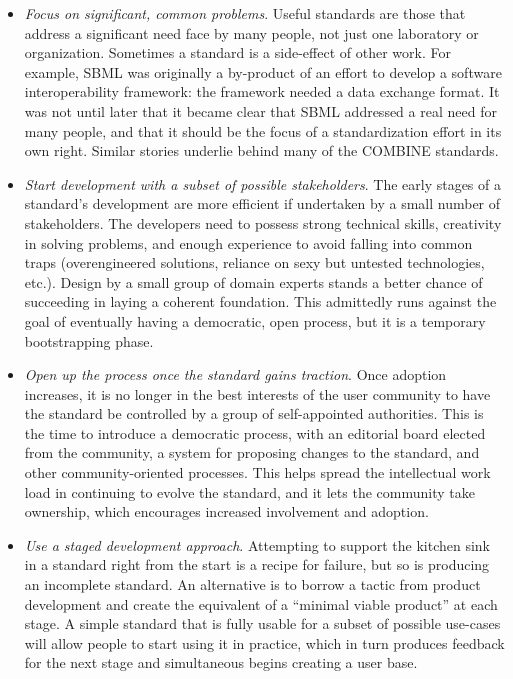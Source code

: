 \vspace*{-1em}
\begin{itemize}

\item \emph{Focus on significant, common problems}.  Useful standards are those that address a significant need face by many people, not just one laboratory or organization.  Sometimes a standard is a side-effect of other work.  For example, SBML was originally a by-product of an effort to develop a software interoperability framework: the framework needed a data exchange format.  It was not until later that it became clear that SBML addressed a real need for many people, and that it should be the focus of a standardization effort in its own right.  Similar stories underlie behind many of the COMBINE standards.

\item \emph{Start development with a subset of possible stakeholders}.  The early stages of a standard's development are more efficient if undertaken by a small number of stakeholders.  The developers need to possess strong technical skills, creativity in solving problems, and enough experience to avoid falling into common traps (\eg overengineered solutions, reliance on sexy but untested technologies, etc.).  Design by a small group of domain experts stands a better chance of succeeding in laying a coherent foundation.  This admittedly runs against the goal of eventually having a democratic, open process, but it is a temporary bootstrapping phase.

\item \emph{Open up the process once the standard gains traction}.  Once adoption increases, it is no longer in the best interests of the user community to have the standard be controlled by a group of self-appointed authorities.  This is the time to introduce a democratic process, with an editorial board elected from the community, a system for proposing changes to the standard, and other community-oriented processes.  This helps spread the intellectual work load in continuing to evolve the standard, and it lets the community take ownership, which encourages increased involvement and adoption.

\item \emph{Use a staged development approach}.  Attempting to support the kitchen sink in a standard right from the start is a recipe for failure, but so is producing an incomplete standard.  An alternative is to borrow a tactic from product development and create the equivalent of a ``minimal viable product'' at each stage.  A simple standard that is fully usable for a subset of possible use-cases will allow people to start using it in practice, which in turn produces feedback for the next stage and simultaneous begins creating a user base.


\end{itemize}
